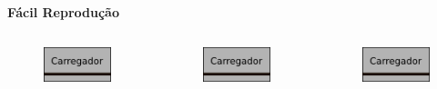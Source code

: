 \documentclass{beamer}
\begin{document}
\begin{frame}
			\centering				
			\textbf{Fácil Reprodução} 	
\begin{columns}
	\begin{figure}[h]
		\includegraphics[width=\textwidth]{charger2}
	\end{figure}
	\begin{figure}[h]
		\includegraphics[width=\textwidth]{charger2}
	\end{figure}
	\begin{figure}[h]
		\includegraphics[width=\textwidth]{charger2}
	\end{figure}

\end{columns}
\end{frame}
\end{document}
